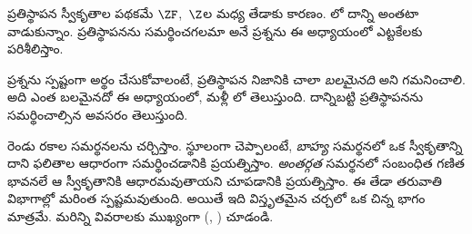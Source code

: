 \documentclass[../../../include/open-logic-section]{subfiles}
\begin{document}

ప్రతిస్థాపన స్వీకృతాల పథకమే $\ZF$,~$\Z$ల మధ్య తేడాకు కారణం.
లో దాన్ని
అంతటా వాడుకున్నాం. ప్రతిస్థాపనను సమర్థించగలమా అనే
ప్రశ్నను ఈ అధ్యాయంలో ఎట్టకేలకు పరిశీలిస్తాం.

ప్రశ్నను స్పష్టంగా అర్థం చేసుకోవాలంటే, ప్రతిస్థాపన నిజానికి చాలా
\emph{బలమైనది} అని గమనించాలి. అది ఎంత బలమైనదో ఈ అధ్యాయంలో,
మళ్లీ లో తెలుస్తుంది.
దాన్నిబట్టి ప్రతిస్థాపనను సమర్థించాల్సిన అవసరం తెలుస్తుంది.

రెండు రకాల సమర్థనలను చర్చిస్తాం. స్థూలంగా చెప్పాలంటే,
\emph{బాహ్య} సమర్థనలో ఒక స్వీకృతాన్ని దాని ఫలితాల ఆధారంగా
సమర్థించడానికి ప్రయత్నిస్తాం. \emph{అంతర్గత} సమర్థనలో
సంబంధిత గణిత భావనలే ఆ స్వీకృతానికి ఆధారమవుతాయని
చూపడానికి ప్రయత్నిస్తాం. ఈ తేడా తరువాతి విభాగాల్లో
మరింత స్పష్టమవుతుంది. అయితే ఇది విస్తృతమైన చర్చలో ఒక
చిన్న భాగం మాత్రమే. మరిన్ని వివరాలకు ముఖ్యంగా
\citeauthor{Maddy1988a} (\citeyear{Maddy1988a}, \citeyear{Maddy1988b}) చూడండి.
\end{document}
